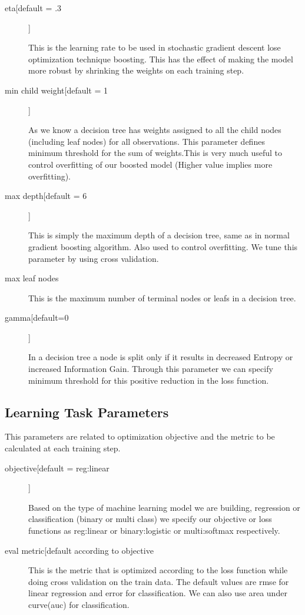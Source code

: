 \begin{description}
\item[eta[default = .3]]

This is the learning rate to be used in stochastic gradient descent lose
optimization  technique boosting. This has the effect of making the model more
robust by shrinking the  weights on each training step.

\item[min child weight[default = 1]] 

As we know a decision tree has weights assigned to all the child nodes
(including leaf nodes) for all observations. This parameter defines minimum
threshold for the sum of  weights.This is very much useful to control
overfitting of our boosted model  (Higher  value implies more overfitting).

\item[max depth[default = 6]]

This is simply the maximum depth of a decision tree, same as in normal gradient
boosting  algorithm. Also used to control overfitting. We tune this parameter by
using cross validation.

\item[max leaf nodes]

This is the maximum number of terminal nodes or leafs in a decision tree.

\item[gamma[default=0]]

In a decision tree a node is split only if it results in decreased Entropy or
increased  Information Gain. Through this parameter  we can specify minimum
threshold for this positive  reduction in the loss function.

\end{description}

\subsection{Learning Task Parameters} 

This parameters are related to optimization objective and the metric to be
calculated at each training step.

\begin{description}

\item[objective[default = reg:linear]]

Based on the type of machine learning model we are building, regression or
classification (binary or multi class) we specify our objective or loss
functions as reg:linear or binary:logistic or  multi:softmax respectively.

\item[eval metric[default according to objective]

This is the metric that is optimized according to the loss function while doing
cross  validation on the train data. The default values are rmse for linear
regression and  error  for classification. We can also use area under curve(auc)
for classification.

\end{description}

